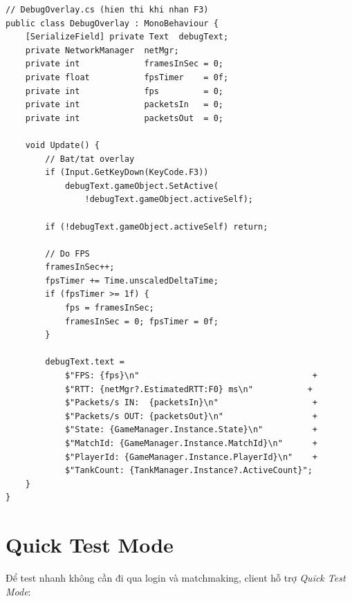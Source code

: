 \documentclass[12pt,a4paper]{report}
\begin{document}
\begin{lstlisting}[style=bashStyle, caption={Debug overlay hiển thị thông tin mạng và hiệu suất}, label={lst:debugoverlay}]
// DebugOverlay.cs (hien thi khi nhan F3)
public class DebugOverlay : MonoBehaviour {
    [SerializeField] private Text  debugText;
    private NetworkManager  netMgr;
    private int             framesInSec = 0;
    private float           fpsTimer    = 0f;
    private int             fps         = 0;
    private int             packetsIn   = 0;
    private int             packetsOut  = 0;

    void Update() {
        // Bat/tat overlay
        if (Input.GetKeyDown(KeyCode.F3))
            debugText.gameObject.SetActive(
                !debugText.gameObject.activeSelf);

        if (!debugText.gameObject.activeSelf) return;

        // Do FPS
        framesInSec++;
        fpsTimer += Time.unscaledDeltaTime;
        if (fpsTimer >= 1f) {
            fps = framesInSec;
            framesInSec = 0; fpsTimer = 0f;
        }

        debugText.text =
            $"FPS: {fps}\n"                                   +
            $"RTT: {netMgr?.EstimatedRTT:F0} ms\n"           +
            $"Packets/s IN:  {packetsIn}\n"                   +
            $"Packets/s OUT: {packetsOut}\n"                  +
            $"State: {GameManager.Instance.State}\n"          +
            $"MatchId: {GameManager.Instance.MatchId}\n"      +
            $"PlayerId: {GameManager.Instance.PlayerId}\n"    +
            $"TankCount: {TankManager.Instance?.ActiveCount}";
    }
}
\end{lstlisting}

\section{Quick Test Mode}

Để test nhanh không cần đi qua login và matchmaking, client hỗ trợ \textit{Quick Test Mode}:
\end{document}
